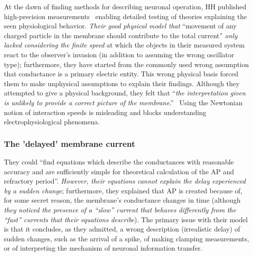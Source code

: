 At the dawn of finding methods for describing neuronal operation,
\gls{HH}
published high-precision measurements~\cite{HodgkinHuxley:1952}
enabling detailed testing of theories explaining the seen physiological
behavior. \emph{Their good physical model that }``movement
of any charged particle in the membrane should contribute to the total
current'' \emph{only lacked considering the finite speed} at which the objects in
their measured system react to the observer's invasion (in addition to assuming the wrong oscillator type); furthermore,
they have started from the commonly used wrong assumption that conductance
is a primary electric entity. This wrong physical basis forced them
to make unphysical assumptions to explain their findings. Although
they attempted to give a physical background, they felt that ``\emph{the
	interpretation given is unlikely to provide a correct picture of the
	membrane}.''~\cite{HodgkinHuxley:1952} Using the Newtonian notion
of interaction speeds is misleading and blocks understanding electrophysiological
phenomena. 

\subsubsection{The 'delayed' membrane current\label{sec:Single-DelayedMembraneCurrent}}


They could ``find equations which describe the conductances with
reasonable accuracy and are sufficiently simple for theoretical calculation
of the \gls{AP}
and refractory period''. \emph{However, their equations
	cannot explain the delay experienced by a sudden change}; furthermore,
they explained that \gls{AP}
is created because of, for some secret
reason, the membrane's conductance changes in time (although \emph{they noticed the presence of a ``slow'' current
	that behaves differently from the ``fast'' currents that their equations
	describe}). The primary issue with their model is that
it concludes, as they admitted, a wrong description (irrealistic delay) of
sudden changes, such as the arrival of a spike, of making clamping
measurements, or of interpreting the mechanism of neuronal information
transfer. 

